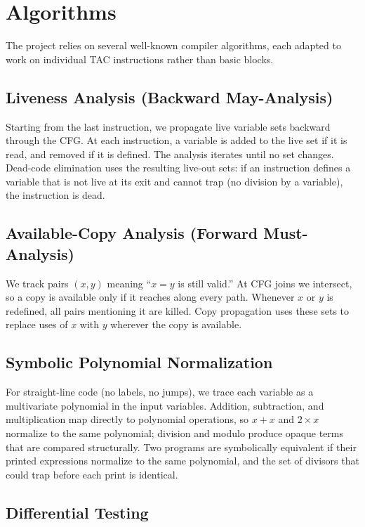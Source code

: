 \documentclass[12pt,a4paper]{report}
\begin{document}
\section{Algorithms}

The project relies on several well-known compiler algorithms, each adapted to work on individual TAC instructions rather than basic blocks.

\subsection{Liveness Analysis (Backward May-Analysis)}

Starting from the last instruction, we propagate live variable sets backward through the CFG. At each instruction, a variable is added to the live set if it is read, and removed if it is defined. The analysis iterates until no set changes. Dead-code elimination uses the resulting live-out sets: if an instruction defines a variable that is not live at its exit and cannot trap (no division by a variable), the instruction is dead.

\subsection{Available-Copy Analysis (Forward Must-Analysis)}

We track pairs $(x, y)$ meaning ``$x = y$ is still valid.'' At CFG joins we intersect, so a copy is available only if it reaches along every path. Whenever $x$ or $y$ is redefined, all pairs mentioning it are killed. Copy propagation uses these sets to replace uses of $x$ with $y$ wherever the copy is available.

\subsection{Symbolic Polynomial Normalization}

For straight-line code (no labels, no jumps), we trace each variable as a multivariate polynomial in the input variables. Addition, subtraction, and multiplication map directly to polynomial operations, so $x + x$ and $2 \times x$ normalize to the same polynomial; division and modulo produce opaque terms that are compared structurally. Two programs are symbolically equivalent if their printed expressions normalize to the same polynomial, and the set of divisors that could trap before each print is identical.

\subsection{Differential Testing}
\end{document}
